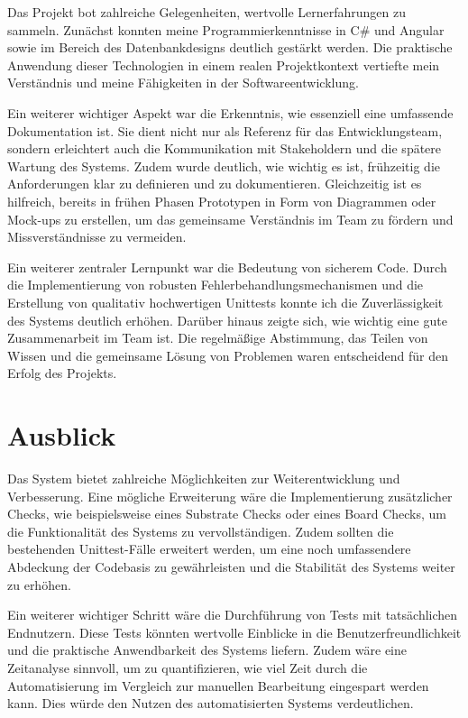 Das Projekt bot zahlreiche Gelegenheiten, wertvolle Lernerfahrungen zu sammeln. Zunächst konnten meine Programmierkenntnisse in C\# und Angular sowie im Bereich des Datenbankdesigns deutlich gestärkt werden. Die praktische Anwendung dieser Technologien in einem realen Projektkontext vertiefte mein Verständnis und meine Fähigkeiten in der Softwareentwicklung.

Ein weiterer wichtiger Aspekt war die Erkenntnis, wie essenziell eine umfassende Dokumentation ist. Sie dient nicht nur als Referenz für das Entwicklungsteam, sondern erleichtert auch die Kommunikation mit Stakeholdern und die spätere Wartung des Systems. Zudem wurde deutlich, wie wichtig es ist, frühzeitig die Anforderungen klar zu definieren und zu dokumentieren. Gleichzeitig ist es hilfreich, bereits in frühen Phasen Prototypen in Form von Diagrammen oder Mock-ups zu erstellen, um das gemeinsame Verständnis im Team zu fördern und Missverständnisse zu vermeiden.

Ein weiterer zentraler Lernpunkt war die Bedeutung von sicherem Code. Durch die Implementierung von robusten Fehlerbehandlungsmechanismen und die Erstellung von qualitativ hochwertigen Unittests konnte ich die Zuverlässigkeit des Systems deutlich erhöhen.  Darüber hinaus zeigte sich, wie wichtig eine gute Zusammenarbeit im Team ist. Die regelmäßige Abstimmung, das Teilen von Wissen und die gemeinsame Lösung von Problemen waren entscheidend für den Erfolg des Projekts.

\section{Ausblick}

Das System bietet zahlreiche Möglichkeiten zur Weiterentwicklung und Verbesserung. Eine mögliche Erweiterung wäre die Implementierung zusätzlicher Checks, wie beispielsweise eines Substrate Checks oder eines Board Checks, um die Funktionalität des Systems zu vervollständigen. Zudem sollten die bestehenden Unittest-Fälle erweitert werden, um eine noch umfassendere Abdeckung der Codebasis zu gewährleisten und die Stabilität des Systems weiter zu erhöhen.

Ein weiterer wichtiger Schritt wäre die Durchführung von Tests mit tatsächlichen Endnutzern. Diese Tests könnten wertvolle Einblicke in die Benutzerfreundlichkeit und die praktische Anwendbarkeit des Systems liefern. Zudem wäre eine Zeitanalyse sinnvoll, um zu quantifizieren, wie viel Zeit durch die Automatisierung im Vergleich zur manuellen Bearbeitung eingespart werden kann. Dies würde den Nutzen des automatisierten Systems verdeutlichen. 

